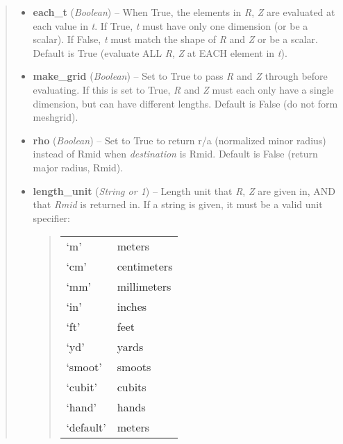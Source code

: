 \documentclass[letterpaper,10pt,english]{sphinxmanual}
\begin{document}
\begin{fulllineitems}
\begin{fulllineitems}
\begin{quote}
\begin{description}
\begin{itemize}
\item {} 
\textbf{each\_t} (\emph{Boolean}) --
When True, the elements in \emph{R}, \emph{Z} are evaluated
at each value in \emph{t}. If True, \emph{t} must have only one dimension
(or be a scalar). If False, \emph{t} must match the shape of \emph{R} and
\emph{Z} or be a scalar. Default is True (evaluate ALL \emph{R}, \emph{Z} at
EACH element in \emph{t}).

\item {} 
\textbf{make\_grid} (\emph{Boolean}) --
Set to True to pass \emph{R} and \emph{Z} through
 before evaluating. If this is set to
True, \emph{R} and \emph{Z} must each only have a single dimension, but
can have different lengths. Default is False (do not form
meshgrid).

\item {} 
\textbf{rho} (\emph{Boolean}) --
Set to True to return r/a (normalized minor radius)
instead of Rmid when \emph{destination} is Rmid. Default is False
(return major radius, Rmid).

\item {} 
\textbf{length\_unit} (\emph{String or 1}) --
Length unit that \emph{R}, \emph{Z} are given in,
AND that \emph{Rmid} is returned in. If a string is given, it must
be a valid unit specifier:
\begin{quote}

\begin{tabulary}{\linewidth}{|L|L|}
\hline

`m'
 & 
meters
\\

`cm'
 & 
centimeters
\\

`mm'
 & 
millimeters
\\

`in'
 & 
inches
\\

`ft'
 & 
feet
\\

`yd'
 & 
yards
\\

`smoot'
 & 
smoots
\\

`cubit'
 & 
cubits
\\

`hand'
 & 
hands
\\

`default'
 & 
meters
\\
\hline\end{tabulary}


\end{quote}
\end{itemize}
\end{description}
\end{quote}
\end{fulllineitems}
\end{fulllineitems}
\end{document}
